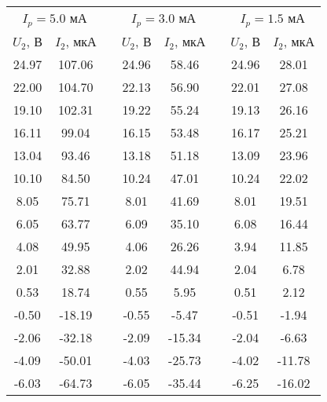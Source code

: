 \begin{table}[!]
\centering
\begin{tabular}{|c|c|c|c|c|c|c|c|}
\cline{1-2} \cline{4-5} \cline{7-8}

\multicolumn{2}{|c|}{$I_p = 5.0$ мА} &  & \multicolumn{2}{c|}{$I_p = 3.0$ мА} &  & \multicolumn{2}{c|}{$I_p = 1.5$ мА} \\ \cline{1-2} \cline{4-5} \cline{7-8} 

$U_2$, В & $I_2$, мкА &  & $U_2$, В & $I_2$, мкА &  & $U_2$, В & $I_2$, мкА \\ 
\cline{1-2} \cline{4-5} \cline{7-8}
 
 24.97 &  107.06 & &  24.96 &  58.46 & &  24.96 &  28.01 
 \\ \cline{1-2} \cline{4-5} \cline{7-8}
 22.00 &  104.70 & &  22.13 &  56.90 & &  22.01 &  27.08 
 \\ \cline{1-2} \cline{4-5} \cline{7-8}
 19.10 &  102.31 & &  19.22 &  55.24 & &  19.13 &  26.16 
 \\ \cline{1-2} \cline{4-5} \cline{7-8}
 16.11 &   99.04 & &  16.15 &  53.48 & &  16.17 &  25.21 
 \\ \cline{1-2} \cline{4-5} \cline{7-8}
 13.04 &   93.46 & &  13.18 &  51.18 & &  13.09 &  23.96 
 \\ \cline{1-2} \cline{4-5} \cline{7-8}
 10.10 &   84.50 & &  10.24 &  47.01 & &  10.24 &  22.02 
 \\ \cline{1-2} \cline{4-5} \cline{7-8}
  8.05 &   75.71 & &   8.01 &  41.69 & &   8.01 &  19.51 
 \\ \cline{1-2} \cline{4-5} \cline{7-8}
  6.05 &   63.77 & &   6.09 &  35.10 & &   6.08 &  16.44
 \\ \cline{1-2} \cline{4-5} \cline{7-8}
  4.08 &   49.95 & &   4.06 &  26.26 & &   3.94 &  11.85
 \\ \cline{1-2} \cline{4-5} \cline{7-8}
  2.01 &   32.88 & &   2.02 &  44.94 & &   2.04 &   6.78
 \\ \cline{1-2} \cline{4-5} \cline{7-8}
  0.53 &   18.74 & &   0.55 &   5.95 & &   0.51 &   2.12
 \\ \cline{1-2} \cline{4-5} \cline{7-8}
 -0.50 &  -18.19 & &  -0.55 &  -5.47 & &  -0.51 &  -1.94
 \\ \cline{1-2} \cline{4-5} \cline{7-8}
 -2.06 &  -32.18 & &  -2.09 & -15.34 & &  -2.04 &  -6.63 
 \\ \cline{1-2} \cline{4-5} \cline{7-8}
 -4.09 &  -50.01 & &  -4.03 & -25.73 & &  -4.02 & -11.78 
 \\ \cline{1-2} \cline{4-5} \cline{7-8}
 -6.03 &  -64.73 & &  -6.05 & -35.44 & &  -6.25 & -16.02 

\end{tabular}
\end{table}
